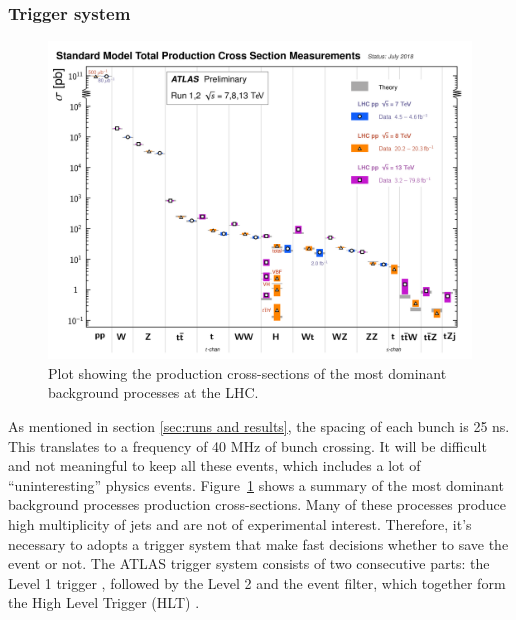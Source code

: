 \documentclass[letterpaper,12pt]{article}
\begin{document}
	\subsubsection{Trigger system}
	\begin{figure}[bht]
		\begin{centering}	
		\includegraphics[width=.97\textwidth]{Detector_plots/summary xs.png}
		\caption{Plot showing the production cross-sections of the most dominant
		background processes at the LHC.}
		\label{fig:summary production Xs}
		\end{centering}
	\end{figure}
	As mentioned in section \ref{sec:runs and results}, the spacing of each bunch
	is 25 ns. This translates to a frequency of 40 MHz of bunch crossing. It
	will be difficult and not meaningful to keep all these events, which includes
	a lot of ``uninteresting'' physics events. Figure~\ref{fig:summary production Xs} 
	shows a summary of the most dominant background processes production cross-sections.
	Many of these processes produce high multiplicity of jets and are not of experimental
	interest. Therefore, it's necessary to adopts a trigger system that make fast decisions
	whether to save the event or not.
	The ATLAS trigger system consists of two consecutive parts: the Level 1 trigger
	\cite{ATLAS-TDR-12}, followed by the Level 2 and the event filter, 
	which together form the High Level Trigger (HLT)
	\cite{ATLAS-TDR-16}.
	
\end{document}
